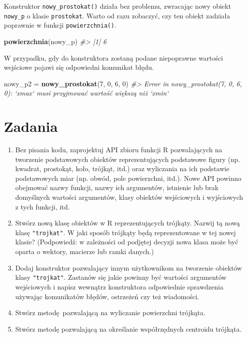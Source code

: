 \documentclass[paper=6in:9in,pagesize=pdftex,headinclude=on,footinclude=on,10pt]{scrbook}
\newenvironment{Shaded}{\begin{snugshade}}{\end{snugshade}}
\newcommand{\CommentTok}[1]{\textcolor[rgb]{0.56,0.35,0.01}{\textit{#1}}}
\newcommand{\DecValTok}[1]{\textcolor[rgb]{0.00,0.00,0.81}{#1}}
\newcommand{\KeywordTok}[1]{\textcolor[rgb]{0.13,0.29,0.53}{\textbf{#1}}}
\newcommand{\NormalTok}[1]{#1}
\newcommand{\StringTok}[1]{\textcolor[rgb]{0.31,0.60,0.02}{#1}}
\begin{document}
Konstruktor \texttt{nowy\_prostokat()} działa bez problemu, zwracając nowy obiekt \texttt{nowy\_p} o klasie \texttt{prostokat}.
Warto od razu zobaczyć, czy ten obiekt zadziała poprawnie w funkcji \texttt{powierzchnia()}.

\begin{Shaded}
\begin{Highlighting}[]
\KeywordTok{powierzchnia}\NormalTok{(nowy_p)}
\CommentTok{#> [1] 6}
\end{Highlighting}
\end{Shaded}

W przypadku, gdy do konstruktora zostaną podane niepoprawne wartości wejściowe pojawi się odpowiedni komunikat błędu.

\begin{Shaded}
\begin{Highlighting}[]
\NormalTok{nowy_p2 =}\StringTok{ }\KeywordTok{nowy_prostokat}\NormalTok{(}\DecValTok{7}\NormalTok{, }\DecValTok{0}\NormalTok{, }\DecValTok{6}\NormalTok{, }\DecValTok{0}\NormalTok{)}
\CommentTok{#> Error in nowy_prostokat(7, 0, 6, 0): `xmax` musi przyjmować wartość większą niż `xmin`}
\end{Highlighting}
\end{Shaded}

\hypertarget{zadania-9}{%
\section{Zadania}\label{zadania-9}}

\begin{enumerate}
\def\labelenumi{\arabic{enumi})}
\item
  Bez pisania kodu, zaprojektuj API zbioru funkcji R pozwalających na tworzenie podstawowych obiektów reprezentujących podstawowe figury (np. kwadrat, prostokąt, koło, trójkąt, itd.) oraz wyliczania na ich podstawie podstawowych miar (np. obwód, pole powierzchni, itd.).
  Nowe API powinno obejmować nazwy funkcji, nazwy ich argumentów, istnienie lub brak domyślnych wartości argumentów, klasy obiektów wejściowych i wyjściowych z tych funkcji, itd.
\item
  Stwórz nową klasę obiektów w R reprezentujących trójkąty.
  Nazwij tą nową klasę \texttt{"trojkat"}.
  W jaki sposób trójkąty będą reprezentowane w tej nowej klasie?
  (Podpowiedź: w zależności od podjętej decyzji nowa klasa może być oparta o wektory, macierze lub ramki danych.)
\item
  Dodaj konstruktor pozwalający innym użytkownikom na tworzenie obiektów klasy \texttt{"trojkat"}.
  Zastanów się jakie powinny być wartości argumentów wejściowych i napisz wewnątrz konstruktora odpowiednie sprawdzenia używając komunikatów błędów, ostrzeżeń czy też wiadomości.
\item
  Stwórz metodę~pozwalającą na wyliczanie powierzchni trójkąta.
\item
  Stwórz metodę pozwalającą na określanie współrzędnych centroidu trójkąta.
\end{enumerate}
\end{document}
